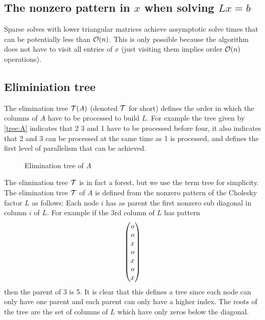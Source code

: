 \documentclass{article}
\begin{document}
\subsection{The nonzero pattern in $x$ when solving $Lx=b$}
    Sparse solves with lower triangular matrices achieve assymptotic 
    solve times that can be potentially less than $\mathcal{O}(n)$. This is only possible because 
    the algorithm does not have to visit all entries of $x$ (just visiting them 
    implies order $\mathcal{O}(n)$ operations).

\subsection{Eliminiation tree}
    The elimination tree $\mathcal{T}(A)$ (denoted $\mathcal{T}$ for short) 
    defines the order in which the columns of 
    $A$ have to be processed to build $L$. For example the tree given by 
    \eqref{tree:A} indicates that 2  3 and 1 have to be processed before four, 
    it also indicates that 2 and 3 can be processed at the same time as 1 is processed, 
    and defines the first level of parallelism that can be achieved. 
\begin{figure}[H]
\centering
\caption{Elimination tree of $A$}
\label{tree:A}
\end{figure}

The elimination tree $\mathcal{T}$ is in fact a forest, but we use the term tree for simplicity. 
The elimination tree $\mathcal{T}$ of $A$ is defined from the nonzero pattern of the Cholesky factor $L$ as follows:
Each node $i$ has as parent the first nonzero sub diagonal in column $i$ of $L$. 
For example if the 3rd column of $L$ has pattern \[\begin{pmatrix}o\\o\\x\\o\\x\\o\\x\end{pmatrix}\] then 
the parent of 3 is 5. 
It is clear that this defines a tree since each node can only have one parent
and each parent can only have a higher index. 
The roots of the tree are the set of columns of $L$ which have only zeros 
below the diagonal. \\
\end{document}
